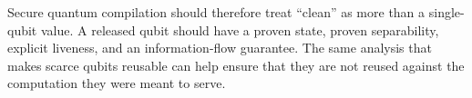 Secure quantum compilation should therefore treat ``clean'' as more than a
single-qubit value. A released qubit should have a proven state, proven
separability, explicit liveness, and an information-flow guarantee. The same
analysis that makes scarce qubits reusable can help ensure that they are not
reused against the computation they were meant to serve.
